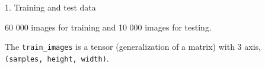 \documentclass[10pt,ignorenonframetext,]{beamer}
\newenvironment{Shaded}{\begin{snugshade}}{\end{snugshade}}
\newcommand{\StringTok}[1]{\textcolor[rgb]{0.31,0.60,0.02}{#1}}
\newcommand{\CommentTok}[1]{\textcolor[rgb]{0.56,0.35,0.01}{\textit{#1}}}
\newcommand{\OperatorTok}[1]{\textcolor[rgb]{0.81,0.36,0.00}{\textbf{#1}}}
\newcommand{\NormalTok}[1]{#1}
\begin{document}
\begin{frame}[fragile]

\begin{block}{1. Training and test data}

60 000 images for training and 10 000 images for testing.

\begin{Shaded}
\end{Shaded}

The \texttt{train\_images} is a tensor (generalization of a matrix) with
3 axis, \texttt{(samples,\ height,\ width)}.

\end{block}

\end{frame}
\end{document}
